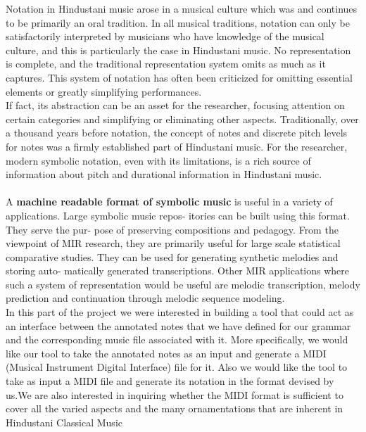 \documentclass[12pt,a4paper]{article}
\begin{document}
Notation in Hindustani music arose in a musical culture which was and continues to be primarily an oral tradition. In all musical traditions, notation can only be satisfactorily interpreted by musicians who have knowledge of the musical culture, and this is particularly the case in Hindustani music. No representation is complete, and the traditional representation system omits as much as it captures. This system of notation has often been criticized for omitting essential elements or greatly simplifying performances.\\

If fact, its abstraction can be an asset for the researcher, focusing attention on certain categories and simplifying or eliminating other aspects. Traditionally, over a thousand years before notation, the concept of notes and discrete pitch levels for notes was a firmly established part of Hindustani music. For the researcher, modern symbolic notation, even with its limitations, is a rich source of information about pitch and durational information in Hindustani music.\\ \\
A \textbf{machine readable format of symbolic music} is useful in a variety of applications. Large symbolic music repos- itories can be built using this format. They serve the pur- pose of preserving compositions and pedagogy. From the viewpoint of MIR research, they are primarily useful for large scale statistical comparative studies. They can be used for generating synthetic melodies and storing auto- matically generated transcriptions. Other MIR applications where such a system of representation would be useful are melodic transcription, melody prediction and continuation through melodic sequence modeling.\\

In this part of the project we were interested in building a tool that could act as an interface between the annotated notes that we have defined for our grammar and the corresponding music file associated with it. More specifically, we would like our tool to take the annotated notes as an input and generate a MIDI (Musical Instrument Digital Interface) file for it. Also we would like the tool to take as input a MIDI file and generate its notation in the format devised by us.We are also interested in inquiring whether the MIDI format is sufficient to cover all the varied aspects and the many ornamentations that are inherent in Hindustani Classical Music 
\linebreak
\end{document}
